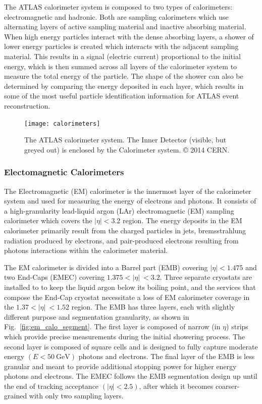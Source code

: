 The ATLAS calorimeter system is composed to two types of calorimeters: electromagnetic and hadronic.
Both are sampling calorimeters which use alternating layers of active sampling material and inactive absorbing material.
When high energy particles interact with the dense absorbing layers, a shower of lower energy particles is created which interacts with the adjacent sampling material.
This results in a signal (electric current) proportional to the initial energy, which is then summed across all layers of the calorimeter system to measure the total energy of the particle.
The shape of the shower can also be determined by comparing the energy deposited in each layer, which results in some of the most useful particle identification information for ATLAS event reconstruction.

\begin{figure}
	\centering
	\texttt{[image: calorimeters]}
	\caption{The ATLAS calorimeter system. The Inner Detector (visible, but greyed out) is enclosed by the Calorimeter system. © 2014 CERN.}
	\label{fig:calorimeter}
\end{figure}

\subsubsection{Electomagnetic Calorimeters}
The Electromagnetic (EM) calorimeter is the innermost layer of the calorimeter system and used for measuring the energy of electrons and photons.
It consists of a high-granularity lead-liquid argon (LAr) electromagnetic (EM) sampling calorimeter which covers the $|\eta| < 3.2$ region.
The energy deposits in the EM calorimeter primarily result from the charged particles in jets, bremsstrahlung radiation produced by electrons, and pair-produced electrons resulting from photons interactions within the calorimeter material.

The EM calorimeter is divided into a Barrel part (EMB) covering $|\eta| < 1.475$ and two End-Caps (EMEC) covering $1.375 < |\eta|\ < 3.2$.
Three separate cryostats are installed to to keep the liquid argon below its boiling point, and the services that compose the End-Cap cryostat necessitate a loss of EM calorimeter coverage in the $1.37 < |\eta|\ < 1.52$ region.
The EMB has three layers, each with slightly different purpose and segmentation granularity, as shown in Fig.~\ref{fig:em_calo_segment}.
The first layer is composed of narrow (in $\eta$) strips which provide precise measurements during the initial showering process.
The second layer is composed of square cells and is designed to fully capture moderate energy $(E < 50 \ \mathrm{GeV})$ photons and electrons.
The final layer of the EMB is less granular and meant to provide additional stopping power for higher energy photons and electrons.
The EMEC follows the EMB segmentation design up until the end of tracking acceptance $(|\eta| < 2.5)$, after which it becomes coarser-grained with only two sampling layers.


